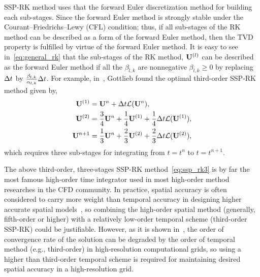 SSP-RK method uses that the forward Euler discretization method for building each sub-stages.
Since the forward Euler method is strongly stable under the Courant–Friedrichs–Lewy (CFL) condition;
thus, if all sub-stages of the RK method can be described as a form of the forward Euler method,
then the TVD property is fulfilled by virtue of the forward Euler method.
It is easy to see in~\cref{eq:general_rk} that the sub-stages of the RK method, \( \mathbf{U}^{(l)} \)
can be described as the forward Euler method if all the \( \beta_{l, k} \) are nonnegative \( \beta_{l, k} \geq 0 \)
by replacing \( \Delta t \) by \( \frac{\beta_{l, k}}{\alpha_{l, k}} \Delta t \).
For example, in~\cite{gottlieb1998total}, Gottlieb found the optimal third-order
SSP-RK method given by,
\begin{equation}\label{eq:ssp_rk3}
    \begin{split}
        \mathbf{U}^{(1)} &= \mathbf{U}^{n} + \Delta t \mathcal{L}(\mathbf{U}^{n}), \\
        \mathbf{U}^{(2)} &= \frac{3}{4} \mathbf{U}^{n} + \frac{1}{4} \mathbf{U}^{(1)} + \frac{1}{4} \Delta t \mathcal{L}(\mathbf{U}^{(1)}), \\
        \mathbf{U}^{n + 1} &= \frac{1}{3} \mathbf{U}^{n} + \frac{2}{3} \mathbf{U}^{(2)} + \frac{2}{3} \Delta t \mathcal{L}(\mathbf{U}^{(2)}),
    \end{split}
\end{equation}
which requires three sub-stages for integrating from \( t = t^{n} \) to \( t = t^{n + 1} \).

The above third-order, three-stages SSP-RK method~\cref{eq:ssp_rk3} is by far
the most famous high-order time integrator used in most high-order method researches in the CFD community.
In practice, spatial accuracy is often considered to carry more weight than temporal accuracy
in designing higher accurate spatial models~\cite{balsara2000monotonicity,mignone2010high},
so combining the high-order spatial method (generally, fifth-order or higher)
with a relatively low-order temporal scheme (third-order SSP-RK) could be justifiable.
However, as it is shown in~\cite{lee2021recursive}, the order of convergence rate of the solution
can be degraded by the order of temporal method (e.g., third-order) in high-resolution computational grids,
so using a higher than third-order temporal scheme is required for maintaining desired spatial accuracy in a high-resolution grid.


